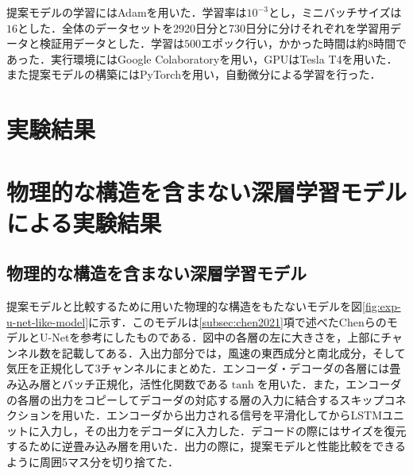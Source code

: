 
提案モデルの学習にはAdam\cite{Kingma2014AdamAM}を用いた．学習率は$10^{-3}$とし，ミニバッチサイズは$16$とした．全体のデータセットを2920日分と730日分に分けそれぞれを学習用データと検証用データとした．学習は$500$エポック行い，かかった時間は約8時間であった．実行環境にはGoogle Colaboratory\cite{GoogleColaboratory}を用い，GPUはTesla T4を用いた．また提案モデルの構築にはPyTorch\cite{NEURIPS2019-9015}を用い，自動微分による学習を行った．

% 

\section{実験結果 \label{section:exp-results}}

\section{物理的な構造を含まない深層学習モデルによる実験結果 \label{section:exp-results-without-physicial-structure}}

\subsection{物理的な構造を含まない深層学習モデル \label{subsection:exp-u-net-like-model}}
提案モデルと比較するために用いた物理的な構造をもたないモデルを図\ref{fig:exp-u-net-like-model}に示す．このモデルは\ref{subsec:chen2021}項で述べたChenらのモデルとU-Net\cite{journals/corr/RonnebergerFB15}を参考にしたものである．図中の各層の左に大きさを，上部にチャンネル数を記載してある．入出力部分では，風速の東西成分と南北成分，そして気圧を正規化して3チャンネルにまとめた．エンコーダ・デコーダの各層には畳み込み層とバッチ正規化\cite{10.5555/3045118.3045167}，活性化関数である$\tanh$を用いた．また，エンコーダの各層の出力をコピーしてデコーダの対応する層の入力に結合するスキップコネクションを用いた．エンコーダから出力される信号を平滑化してからLSTMユニットに入力し，その出力をデコーダに入力した．デコードの際にはサイズを復元するために逆畳み込み層を用いた．出力の際に，提案モデルと性能比較をできるように周囲5マス分を切り捨てた．

